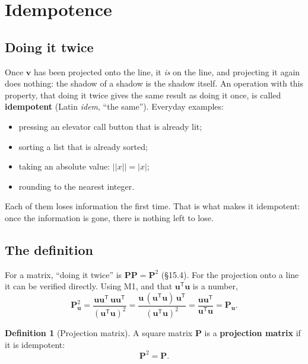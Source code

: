\documentclass[11pt]{article}
\theoremstyle{plain}
\theoremstyle{definition}
\newtheorem{defn}{Definition}[section]
\theoremstyle{remark}
\newcommand{\vc}[1]{\mathbf{#1}}
\newcommand{\mt}[1]{\mathbf{#1}}
\newcommand{\T}{^{\mathsf{T}}}
\begin{document}
\section{Idempotence}

\subsection{Doing it twice}
Once $\vc{v}$ has been projected onto the line, it \emph{is} on the line, and
projecting it again does nothing: the shadow of a shadow is the shadow itself.
An operation with this property, that doing it twice gives the same result as
doing it once, is called \textbf{idempotent} (Latin \emph{idem}, ``the same'').
Everyday examples:
\begin{itemize}[leftmargin=1.4em,itemsep=2pt]
  \item pressing an elevator call button that is already lit;
  \item sorting a list that is already sorted;
  \item taking an absolute value: $\bigl||x|\bigr|=|x|$;
  \item rounding to the nearest integer.
\end{itemize}
Each of them loses information the first time. That is what makes it
idempotent: once the information is gone, there is nothing left to lose.

\subsection{The definition}
For a matrix, ``doing it twice'' is $\mt{P}\mt{P}=\mt{P}^{2}$ (\S15.4). For the
projection onto a line it can be verified directly. Using M1, and that
$\vc{u}\T\vc{u}$ is a number,
\[
  \mt{P}_{\vc{u}}^{2}
  =\frac{\vc{u}\vc{u}\T\,\vc{u}\vc{u}\T}{(\vc{u}\T\vc{u})^{2}}
  =\frac{\vc{u}\,(\vc{u}\T\vc{u})\,\vc{u}\T}{(\vc{u}\T\vc{u})^{2}}
  =\frac{\vc{u}\vc{u}\T}{\vc{u}\T\vc{u}}
  =\mt{P}_{\vc{u}} .
\]

\begin{defn}[Projection matrix]
A square matrix $\mt{P}$ is a \textbf{projection matrix} if it is idempotent:
\[
  \mt{P}^{2}=\mt{P}.
\]
\end{defn}
\end{document}
